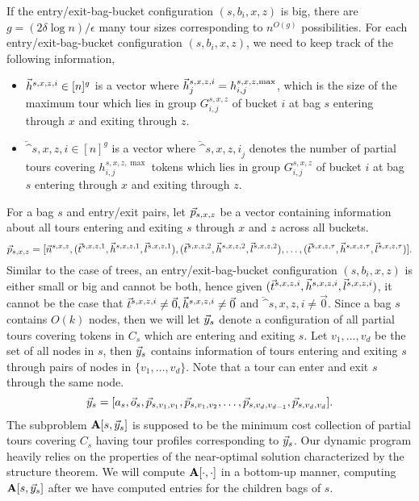\documentclass[twoside,leqno]{article}
\newcommand{\eps}{\epsilon}
\begin{document}
If the entry/exit-bag-bucket configuration $(s,b_i,x,z)$ is big, there are $g = (2\delta \log n)/\eps$ many tour sizes corresponding to $n^{O(g)}$ possibilities. For each  entry/exit-bag-bucket configuration $(s,b_i,x,z)$, we need to keep track of the following information,
\begin{itemize}
    \item $\vec{h}^{s,x,z,i} \in [n]^g$ is a vector where $\vec{h}^{s,x,z,i}_j = h_{i,j}^{s,x,z, \max}$, which is the size of the maximum tour which lies in group $G_{i,j}^{s,x,z}$ of bucket $i$ at bag $s$ entering through $x$ and exiting through $z$.
    \item $\lvec^{s,x,z,i} \in [n]^g$ is a vector where $\lvec^{s,x,z,i}_j$ denotes the number of partial tours covering $h_{i,j}^{s,x,z, \max}$ tokens which lies in group $G_{i,j}^{s,x,z}$ of bucket $i$ at bag $s$ entering through $x$ and exiting through $z$.
\end{itemize}
For a bag $s$ and entry/exit pairs, let $\vec{p}_{s,x,z}$ be a vector containing information about all tours entering and exiting $s$ through $x$ and $z$ across all buckets.
$$\vec{p}_{s,x,z} = [\vec{n}^{s,x,z}, (\vec{t}^{s,x,z,1},\vec{h}^{s,x,z,1},\vec{l}^{s,x,z,1}), (\vec{t}^{s,x,z,2},\vec{h}^{s,x,z,2},\vec{l}^{s,x,z,2}), \ldots, (\vec{t}^{s,x,z,\tau},\vec{h}^{s,x,z,\tau},\vec{l}^{s,x,z,\tau}) ]. $$
Similar to the case of trees, an entry/exit-bag-bucket configuration $(s,b_i,x,z)$ is either small or big and cannot be both, hence given $(\vec{t}^{s,x,z,i},\vec{h}^{s,x,z,i},\vec{l}^{s,x,z,i})$, it cannot be the case that $\vec{t}^{s,x,z,i} \neq \vec{0}, \vec{h}^{s,x,z,i} \neq \vec{0}$ and $\lvec^{s,x,z,i} \neq \vec{0}$. Since a bag $s$ contains $O(k)$ nodes, then we will let $\vec{y}_s$ denote a configuration of all partial tours covering tokens in $C_s$ which are entering and exiting $s$. Let $v_1, \ldots, v_d$ be the set of all nodes in $s$, then $\vec{y}_s$ contains information of tours entering and exiting $s$ through pairs of nodes in
$\{v_1, \ldots, v_d\}$. Note that a tour can enter and exit $s$ through the same node.
$$\vec{y}_s = [a_s, \vec{o}_s, \vec{p}_{s,v_1,v_1}, \vec{p}_{s,v_1,v_2}, \ldots, \vec{p}_{s,v_{d}, v_{d-1}}, \vec{p}_{s, v_d, v_d}]. $$
The subproblem $\textbf{A}[s, \vec{y}_s]$ is supposed to be the minimum cost collection of partial tours covering $C_s$ having tour profiles corresponding to $\vec{y}_s$. Our dynamic program heavily relies on the properties of the near-optimal solution characterized by the structure theorem. We will compute $\textbf{A}[\cdot, \cdot]$ in a bottom-up manner, computing $\textbf{A}[s, \vec{y}_s]$ after we have computed entries for the children bags of $s$.
\end{document}

